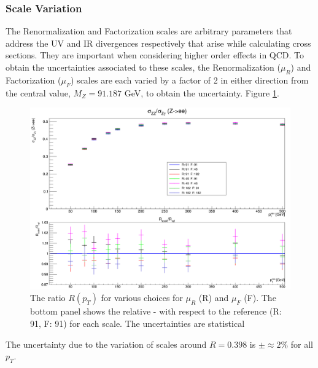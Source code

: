 \documentclass[11pt,a4paper,final]{report}
\begin{document}
\subsubsection{Scale Variation}
The Renormalization and Factorization scales are arbitrary parameters that address the UV and IR divergences respectively that arise while calculating cross sections. They are important when considering higher order effects in QCD. To obtain the uncertainties associated to these scales, the Renormalization ($\mu_R$) and Factorization ($\mu_F$) scales are each varied by a factor of 2 in either direction from the central value, $M_Z = 91.187$ GeV, to obtain the uncertainty. Figure \ref{fig:scalecompare}.
\begin{figure}[H]
\centering
\includegraphics[width=0.8\linewidth]{scale/nlo_scale_overlay.png}
\caption{The ratio $R(p_T)$ for various choices for $\mu_R$ (R) and $\mu_F$ (F). The bottom panel shows the relative - with respect to the reference (R: 91, F: 91) for each scale. The uncertainties are statistical}
\label{fig:scalecompare}
\end{figure}
The uncertainty due to the variation of scales around $R = 0.398$ is $\pm \approx 2\%$ for all $p_T$.
\end{document}
